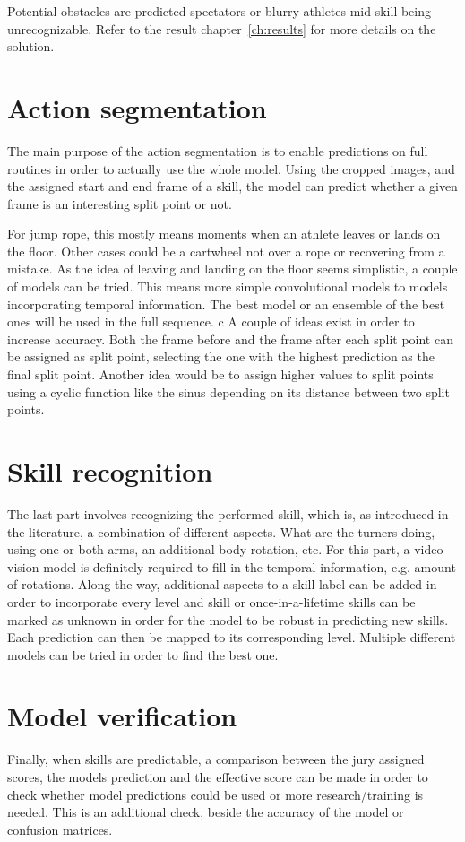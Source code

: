 Potential obstacles are predicted spectators or blurry athletes mid-skill being unrecognizable. Refer to the result chapter~\ref{ch:results} for more details on the solution.

\section{Action segmentation}

The main purpose of the action segmentation is to enable predictions on full routines in order to actually use the whole model. Using the cropped images, and the assigned start and end frame of a skill, the model can predict whether a given frame is an interesting split point or not.

For jump rope, this mostly means moments when an athlete leaves or lands on the floor. Other cases could be a cartwheel not over a rope or recovering from a mistake. As the idea of leaving and landing on the floor seems simplistic, a couple of models can be tried. This means more simple convolutional models to models incorporating temporal information.
The best model or an ensemble of the best ones will be used in the full sequence.
c
A couple of ideas exist in order to increase accuracy. Both the frame before and the frame after each split point can be assigned as split point, selecting the one with the highest prediction as the final split point. Another idea would be to assign higher values to split points using a cyclic function like the sinus depending on its distance between two split points.

\section{Skill recognition}

The last part involves recognizing the performed skill, which is, as introduced in the literature, a combination of different aspects. What are the turners doing, using one or both arms, an additional body rotation, etc.
For this part, a video vision model is definitely required to fill in the temporal information, e.g. amount of rotations.
Along the way, additional aspects to a skill label can be added in order to incorporate every level and skill or once-in-a-lifetime skills can be marked as unknown in order for the model to be robust in predicting new skills. Each prediction can then be mapped to its corresponding level.
Multiple different models can be tried in order to find the best one.


\section{Model verification}

Finally, when skills are predictable, a comparison between the jury assigned scores, the models prediction and the effective score can be made in order to check whether model predictions could be used or more research/training is needed. This is an additional check, beside the accuracy of the model or confusion matrices.

